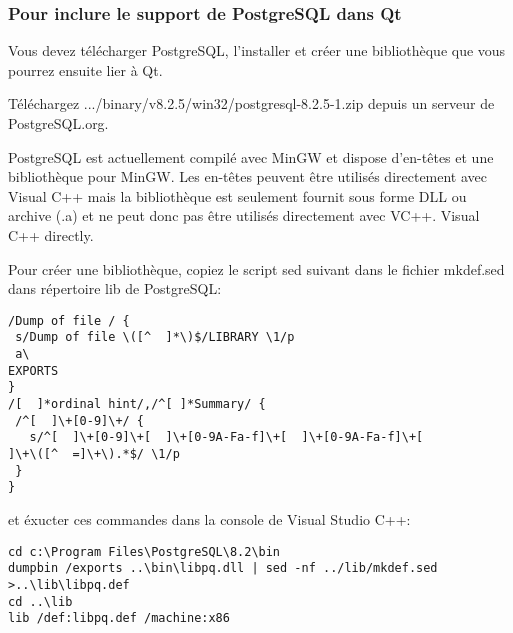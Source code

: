 % 
% 
% 

\subsubsection{Pour inclure le support de PostgreSQL dans Qt}
Vous devez télécharger PostgreSQL, l'installer et créer une bibliothèque que vous pourrez ensuite lier à Qt.

Téléchargez  .../binary/v8.2.5/win32/postgresql-8.2.5-1.zip depuis un serveur de PostgreSQL.org.

PostgreSQL est actuellement compilé avec MinGW et dispose d'en-têtes et une bibliothèque pour MinGW.   Les en-têtes peuvent être utilisés directement avec Visual C++ mais la bibliothèque est seulement fournit sous forme DLL ou archive (.a) et ne peut donc pas être utilisés directement avec VC++.
Visual C++ directly.

Pour créer une bibliothèque, copiez le script sed suivant dans le fichier mkdef.sed dans répertoire lib de PostgreSQL:

\begin{verbatim}
/Dump of file / {
 s/Dump of file \([^  ]*\)$/LIBRARY \1/p
 a\
EXPORTS
}
/[  ]*ordinal hint/,/^[ ]*Summary/ {
 /^[  ]\+[0-9]\+/ {
   s/^[  ]\+[0-9]\+[  ]\+[0-9A-Fa-f]\+[  ]\+[0-9A-Fa-f]\+[ 
]\+\([^  =]\+\).*$/ \1/p
 }
}
\end{verbatim}

et éxucter ces commandes dans la console de Visual Studio C++:

\begin{verbatim}
cd c:\Program Files\PostgreSQL\8.2\bin
dumpbin /exports ..\bin\libpq.dll | sed -nf ../lib/mkdef.sed >..\lib\libpq.def
cd ..\lib
lib /def:libpq.def /machine:x86
\end{verbatim}

